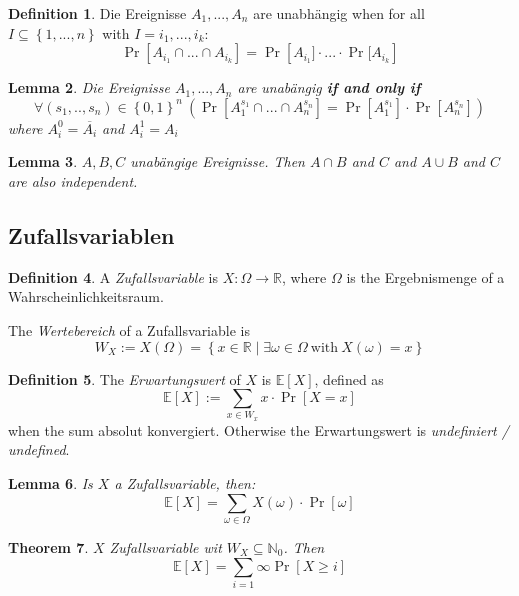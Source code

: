 \documentclass[12pt]{extarticle}
\theoremstyle{definition}
\newtheorem{definition}{Definition}[section]
\theoremstyle{remark}
\theoremstyle{plain}
\newtheorem{theorem}[definition]{Theorem}
\theoremstyle{plain}
\newtheorem{lemma}[definition]{Lemma}
\theoremstyle{plain}
\newcommand{\E}{\mathbb{E}}
\begin{document}
\begin{definition}
    Die Ereignisse $A_1, ..., A_n$ are unabhängig when for all $I \subseteq \left\{ 1, ..., n \right\}$
    with $I = {i_1, ..., i_k}$:
    \[ \Pr \left[ A_{i_1} \cap ... \cap A_{i_k} \right] = \Pr \left[ A_{i_1}] \cdot ... \cdot \Pr[A_{i_k} \right] \]
\end{definition}

\begin{lemma}
    Die Ereignisse $A_1, ..., A_n$ are unabängig \textbf{if and only if}
    \[ \forall (s_1, .., s_n) \in \left\{ 0, 1 \right\}^n\ \left( \Pr[A_1^{s_1} \cap ... \cap A_n^{s_n}] = \Pr[A_1^{s_1}] \cdot \Pr[A_n^{s_n}] \right) \]
    where $A_i^0 = \overline{A_i}$ and $A_i^1 = A_i$
\end{lemma}

\begin{lemma}
    $A, B, C$ unabängige Ereignisse.
    Then $A \cap B$ and $C$ and $A \cup B$ and $C$ are also independent.
\end{lemma}

\subsection{Zufallsvariablen}

\begin{definition}
    A \textit{Zufallsvariable} is $X:\Omega \to \mathbb{R}$,
    where $\Omega$ is the Ergebnismenge of a Wahrscheinlichkeitsraum.

    The \textit{Wertebereich} of a Zufallsvariable is
    \[ W_X := X(\Omega) = \left\{ x \in \mathbb{R} \mid \exists \omega \in \Omega\ \mbox{with}\ X(\omega) = x \right\} \]
\end{definition}

\begin{definition}
    The \textit{Erwartungswert} of $X$ is $\E[X]$, defined as
    \[ \E[X] := \sum_{x \in W_x} x \cdot \Pr[X = x] \]
    when the sum absolut konvergiert. Otherwise the Erwartungswert is \textit{undefiniert / undefined}.
\end{definition}

\begin{lemma}
    Is $X$ a Zufallsvariable, then:
    \[ \E[X] = \sum_{\omega \in \Omega} X(\omega) \cdot \Pr[\omega] \]
\end{lemma}

\begin{theorem}
    $X$ Zufallsvariable wit $W_X \subseteq \mathbb{N}_0$. Then
    \[ \E[X] = \sum_{i=1}\infty \Pr[X \ge i] \]
\end{theorem}
\end{document}
